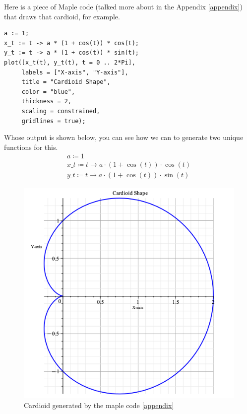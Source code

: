 Here is a piece of Maple code (talked more about in the Appendix \ref{appendix}) that draws that cardioid, for example.

\begin{verbatim}
a := 1;
x_t := t -> a * (1 + cos(t)) * cos(t);
y_t := t -> a * (1 + cos(t)) * sin(t);
plot([x_t(t), y_t(t), t = 0 .. 2*Pi],
     labels = ["X-axis", "Y-axis"],
     title = "Cardioid Shape",
     color = "blue",
     thickness = 2,
     scaling = constrained,
     gridlines = true);
\end{verbatim}

Whose output is shown below, you can see how we can to generate two unique functions for this.
\begin{align*}
	a \coloneq 1 \\
	x\_t \coloneqq t \rightarrow a \cdot \left(1+\cos  \left(t \right)\right)\cdot \cos \left(t \right) \\
	y\_t \coloneqq t \rightarrow a \cdot \left(1+\cos \left(t \right)\right)\cdot \sin \left(t \right)
\end{align*}

\begin{figure}[H]
	\centering
	\includegraphics[width=\textwidth-7cm]{math_pics/maple-cardioid.png}
	\caption{Cardioid generated by the maple code \ref{appendix}}
	\label{fig:cardioid}
\end{figure}

